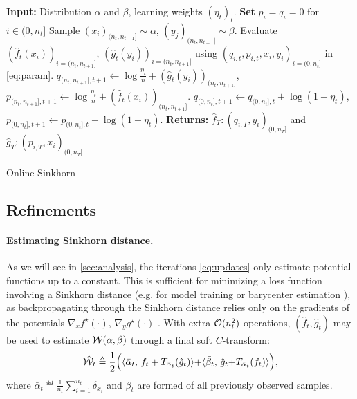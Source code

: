 \begin{algorithm}[t]
    \begin{algorithmic}
    \State \textbf{Input:} Distribution $\alpha$ and $\beta$, learning weights ${(\eta_t)}_t$. 
    \textbf{Set} $p_i = q_i = 0$ for $i \in (0, n_t]$
        \State Sample $(x_i)_{(n_t, n_{t+1}]} \sim \alpha$, $(y_j)_{(n_t, n_{t+1}]} \sim \beta$.
            \State Evaluate $(\hat f_t(x_i))_{i=(n_t, n_{t+1}]}$,
             $(\hat g_t(y_i))_{i=(n_t, n_{t+1}]}$ using $(q_{i,t}, p_{i,t}, x_i, y_i)_{i=(0,n_{t}]}$ in \eqref{eq:param}.
             \State $q_{(n_t, n_{t+1}],t+1} {\gets} \log \frac{\eta_t}{n}
             + (\hat g_t(y_i))_{(n_t, n_{t+1}]}$,
             \qquad $p_{(n_t, n_{t+1}],t+1} {\gets} \log \frac{\eta_t}{n} 
             + (\hat f_t(x_i))_{(n_t, n_{t+1}]}$.
            \State $q_{(0, n_t],t+1} \gets q_{(0, n_t],t} + \log(1 - \eta_t)$, \qquad
            $p_{(0, n_t],t+1} \gets p_{(0, n_t],t} + \log(1 - \eta_t)$.
    \EndFor
    \State \textbf{Returns:} $\hat f_T : (q_{i,T}, y_i)_{(0, n_T]}$ and
    $\hat g_T : (p_{i,T}, x_i)_{(0, n_T]}$
    \end{algorithmic}
    \vspace{-.4em}
    \caption{Online Sinkhorn}\label{alg:online_sinkhorn}
\end{algorithm}


\subsection{Refinements}

\paragraph{Estimating Sinkhorn distance.} 

As we will see in \autoref{sec:analysis}, the iterations \eqref{eq:updates} only estimate potential functions up to a
constant. This is sufficient for minimizing a loss function involving a Sinkhorn
distance (e.g. for model training or barycenter estimation \citep{staib2017parallel}), as backpropagating through the Sinkhorn distance
relies only on the gradients of the potentials $\nabla_x f^\star(\cdot)$,
$\nabla_y g^\star(\cdot)$ \citep[e.g.][]{cuturi2018semidual}. With extra
$\Oo(n_t^2)$ operations, $(\hat f_t, \hat g_t)$ may be used to
estimate $\Ww(\alpha,\beta)$ through a final soft $C$-transform:
\begin{equation}\label{eq-dist-est}
    \hat \Ww_t \triangleq \frac{1}{2}\Big(\dotp{\bar \alpha_t}{f_t + 
    \Ctrans{\hat g_t}{\bar \alpha_t}}
     {+} \dotp{\bar \beta_t}{\hat g_t {+} \Ctrans{f_t}{\bar \alpha_t}}\Big),
\end{equation}
where $\bar \alpha_t \eqdef \frac{1}{n_{t}}\sum_{i=1}^{n_{t}} \delta_{x_i}$
and $\bar \beta_t$ are formed of all previously observed samples.

